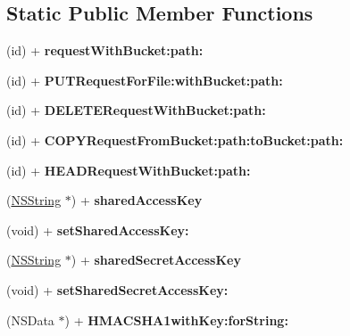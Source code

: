 \subsection*{Static Public Member Functions}
\begin{DoxyCompactItemize}
\item 
\hypertarget{interface_a_s_i_s3_request_a30c01a846dc868730c44959e47bbaa1a}{
(id) + {\bfseries requestWithBucket:path:}}
\label{interface_a_s_i_s3_request_a30c01a846dc868730c44959e47bbaa1a}

\item 
\hypertarget{interface_a_s_i_s3_request_a6f856cb85815735ebcd370cb5339b7a8}{
(id) + {\bfseries PUTRequestForFile:withBucket:path:}}
\label{interface_a_s_i_s3_request_a6f856cb85815735ebcd370cb5339b7a8}

\item 
\hypertarget{interface_a_s_i_s3_request_a5babc08c08f7b4c51db7769ee0c8c62f}{
(id) + {\bfseries DELETERequestWithBucket:path:}}
\label{interface_a_s_i_s3_request_a5babc08c08f7b4c51db7769ee0c8c62f}

\item 
\hypertarget{interface_a_s_i_s3_request_a9cca451381cee7e928573cf315aea177}{
(id) + {\bfseries COPYRequestFromBucket:path:toBucket:path:}}
\label{interface_a_s_i_s3_request_a9cca451381cee7e928573cf315aea177}

\item 
\hypertarget{interface_a_s_i_s3_request_aabe3cf9cf22566005699b979b8eaffdf}{
(id) + {\bfseries HEADRequestWithBucket:path:}}
\label{interface_a_s_i_s3_request_aabe3cf9cf22566005699b979b8eaffdf}

\item 
\hypertarget{interface_a_s_i_s3_request_aadbf1f29ab30efc3f4640bac7b508d32}{
(\hyperlink{class_n_s_string}{NSString} $\ast$) + {\bfseries sharedAccessKey}}
\label{interface_a_s_i_s3_request_aadbf1f29ab30efc3f4640bac7b508d32}

\item 
\hypertarget{interface_a_s_i_s3_request_ad944a2a1b20fc9e4559c8faf4f41b977}{
(void) + {\bfseries setSharedAccessKey:}}
\label{interface_a_s_i_s3_request_ad944a2a1b20fc9e4559c8faf4f41b977}

\item 
\hypertarget{interface_a_s_i_s3_request_af1a72a1aacc05ce3f5def339d3bfbd5f}{
(\hyperlink{class_n_s_string}{NSString} $\ast$) + {\bfseries sharedSecretAccessKey}}
\label{interface_a_s_i_s3_request_af1a72a1aacc05ce3f5def339d3bfbd5f}

\item 
\hypertarget{interface_a_s_i_s3_request_aca8ba2305c0cbee1d7ec8553831768ff}{
(void) + {\bfseries setSharedSecretAccessKey:}}
\label{interface_a_s_i_s3_request_aca8ba2305c0cbee1d7ec8553831768ff}

\item 
\hypertarget{interface_a_s_i_s3_request_a894f809afa5c5ec55231089f2d2af54f}{
(NSData $\ast$) + {\bfseries HMACSHA1withKey:forString:}}
\label{interface_a_s_i_s3_request_a894f809afa5c5ec55231089f2d2af54f}

\end{DoxyCompactItemize}
